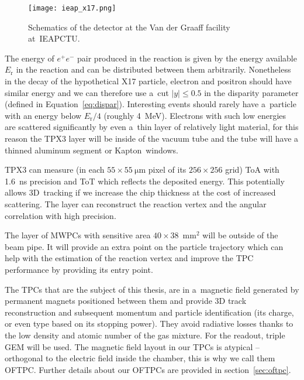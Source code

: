 			\begin{figure}
				\centering
				\texttt{[image: ieap\_x17.png]}
				\caption{Schematics of the detector at the Van der Graaff facility at~\ac{IEAPCTU}.}
				\label{fig:ieap}
			\end{figure}
		
		The energy of $e^+e^-$ pair produced in the reaction is given by the energy available $E_\text{r}$ in the reaction and can be distributed between them arbitrarily. Nonetheless in the decay of the hypothetical X17 particle, electron and positron should have similar energy and we can therefore use a~cut $|y| \leq 0.5$ in the disparity parameter (defined in Equation~\ref{eq:dispar}). Interesting events should rarely have a~particle with an energy below $E_\text{r}/4$ (roughly 4~MeV). Electrons with such low energies are scattered significantly by even a~thin layer of relatively light material, for this reason the \ac{TPX3} layer will be inside of the vacuum tube and the tube will have a thinned aluminum segment or Kapton\texttrademark\ windows.
		
		\ac{TPX3} can measure (in each $55\times55~\mathrm{\mu m}$ pixel of its $256\times256$ grid) \ac{ToA} with 1.6~ns precision and \ac{ToT} which reflects the deposited energy. This potentially allows 3D~tracking if we increase the chip thickness at the cost of increased scattering. The layer can reconstruct the reaction vertex and the angular correlation with high precision.
		
		The layer of \acp{MWPC} with sensitive area $40\times38$~mm$^2$ will be outside of the beam pipe. It will provide an extra point on the particle trajectory which can help with the estimation of the reaction vertex and improve the \ac{TPC} performance by providing its entry point.
		
		The \acp{TPC} that are the subject of this thesis, are in a~magnetic field generated by permanent magnets positioned between them and provide 3D track reconstruction and subsequent momentum and particle identification (its charge, or even type based on its stopping power). They avoid radiative losses thanks to the low density and atomic number of the gas mixture. For the readout, triple \ac{GEM} will be used. The magnetic field layout in our \acp{TPC} is atypical -- orthogonal to the electric field inside the chamber, this is why we call them \acf{OFTPC}. Further details about our \acp{OFTPC} are provided in section~\ref{sec:oftpc}.